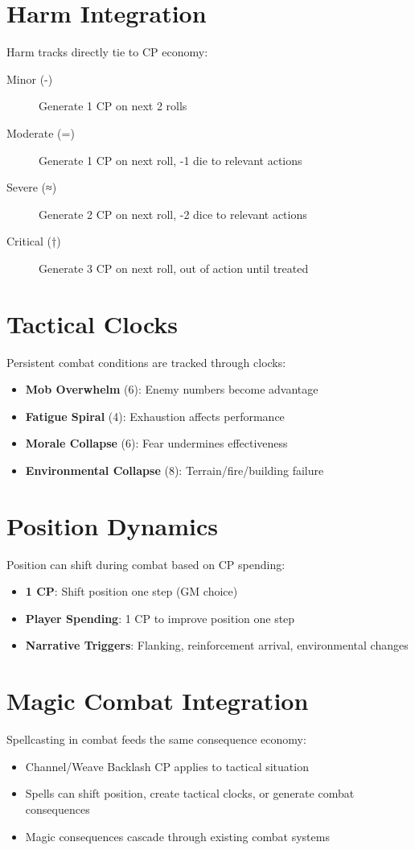 \section{Harm Integration}
Harm tracks directly tie to CP economy:
\begin{description}
\item[Minor (-)] Generate 1 CP on next 2 rolls
\item[Moderate (=)] Generate 1 CP on next roll, -1 die to relevant actions
\item[Severe (≈)] Generate 2 CP on next roll, -2 dice to relevant actions  
\item[Critical (†)] Generate 3 CP on next roll, out of action until treated
\end{description}

\section{Tactical Clocks}
Persistent combat conditions are tracked through clocks:
\begin{itemize}
    \item \textbf{Mob Overwhelm} (6): Enemy numbers become advantage
    \item \textbf{Fatigue Spiral} (4): Exhaustion affects performance
    \item \textbf{Morale Collapse} (6): Fear undermines effectiveness
    \item \textbf{Environmental Collapse} (8): Terrain/fire/building failure
\end{itemize}

\section{Position Dynamics}
Position can shift during combat based on CP spending:
\begin{itemize}
    \item \textbf{1 CP}: Shift position one step (GM choice)
    \item \textbf{Player Spending}: 1 CP to improve position one step
    \item \textbf{Narrative Triggers}: Flanking, reinforcement arrival, environmental changes
\end{itemize}

\section{Magic Combat Integration}
Spellcasting in combat feeds the same consequence economy:
\begin{itemize}
    \item Channel/Weave Backlash CP applies to tactical situation
    \item Spells can shift position, create tactical clocks, or generate combat consequences
    \item Magic consequences cascade through existing combat systems
\end{itemize}

